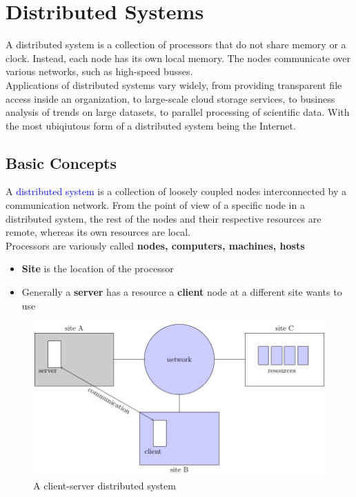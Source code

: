 \documentclass{book/custombook}
\begin{document}
    \chapter{Distributed Systems}
        A distributed system is a collection of processors that do not share memory or
        a clock. Instead, each node has its own local memory. The nodes communicate over 
        various networks, such as high-speed busses.\\
        Applications of distributed systems vary widely, from providing transparent file access
        inside an organization, to large-scale cloud storage services, to business analysis of 
        trends on large datasets, to parallel processing of scientific data. With the most 
        ubiqiutous form of a distributed system being the Internet.
        \section{Basic Concepts}
            A \textcolor{blue}{distributed system} is a collection of loosely coupled nodes
            interconnected by a communication network. From the point of view of a specific node
            in a distributed system, the rest of the nodes and their respective resources are remote,
            whereas its own resources are local.\\
            Processors are variously called \textbf{nodes, computers, machines, hosts}\\
            \begin{itemize}
                \item \textbf{Site} is the location of the processor
                \item Generally a \textbf{server} has a resource a \textbf{client} node at a different
                site wants to use
            \end{itemize}
            \begin{figure}[H]
                \centering
                \includegraphics{figures/client_server.pdf}
                \caption{A client-server distributed system}
            \end{figure}
\end{document}
